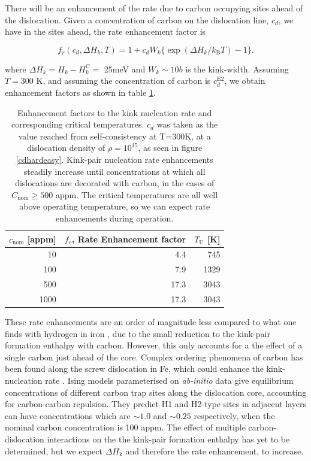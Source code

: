 \documentclass[a4paper,11pt]{article}
\numberwithin{equation}{chapter}
\numberwithin{listing}{chapter}
\begin{document}
There will be an enhancement of the rate due to carbon occupying sites ahead
of the dislocation. Given a concentration of carbon on the dislocation line, \(c_d\), we
have in the sites ahead, the rate enhancement factor is

\begin{equation} \label{eq:enhancementfactor}
  f_r(c_d,\Delta H_{k},T) = 1 + c_d W_k \{  \exp( \Delta H_{k}/k_{\text{B}}T ) - 1 \}.
\end{equation}

where \(\Delta H_{k} = H_k - H_k^{\text{C}} =\) 25meV and \(W_k \sim 10b\) is the
kink-width. Assuming \(T=300\) K, and assuming the concentration of carbon is
\(c_d^{\text{E2}}\), we obtain enhancement factors as
shown in table \ref{rateenhancement}.


\begin{table}[htbp]
\caption{Enhancement factors to the kink nucleation rate and corresponding critical temperatures. \(c_d\) was taken as the value reached from self-consistency at T=300K, at a dislocation density of \(\rho = 10^{15}\), as seen in figure \ref{cdhardeasy}. Kink-pair nucleation rate enhancements steadily increase until concentrations at which all dislocations are decorated with carbon, in the cases of \(C_{\text{nom}} \geq 500\) appm. The critical temperatures are all well above operating temperature, so we can expect rate enhancements during operation. \label{rateenhancement}}
\centering
\begin{tabular}{rrr}
\toprule
\(c_{\text{nom}}\) [appm] & \(f_r\), Rate Enhancement factor & \(T_{\text{U}}\) [K]\\
\midrule
10 & 4.4 & 745\\
100 & 7.9 & 1329\\
500 & 17.3 & 3043\\
1000 & 17.3 & 3043\\
\bottomrule
\end{tabular}
\end{table}


These rate enhancements are an order of magnitude less compared to what one finds with
hydrogen in iron \cite{Simpson2019}, due to the small reduction to the kink-pair
formation enthalpy with carbon. However, this only accounts for a the effect of a
single carbon just ahead of the core. Complex ordering phenomena of carbon has been
found along the screw dislocation in Fe, which could enhance the kink-nucleation rate
\cite{Luthi2019}. Ising models parameterised on \emph{ab-initio} data give equilibrium
concentrations of different carbon trap sites along the dislocation core, accounting
for carbon-carbon repulsion. They predict H1 and H2-type sites in adjacent
layers can have concentrations which are \(\sim 1.0\) and \(\sim 0.25\) respectively, when
the nominal carbon concentration is 100 appm. The effect of multiple
carbon-dislocation interactions on the the kink-pair formation enthalpy has yet to be
determined, but we expect \(\Delta H_{\text{k}}\) and therefore the rate enhancement, to increase.
\end{document}
